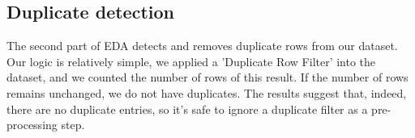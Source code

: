 \documentclass[11pt]{article}
\begin{document}
		\subsection*{Duplicate detection}
			The second part of EDA detects and removes duplicate rows from our dataset. Our logic is relatively simple, we applied a 'Duplicate Row Filter' into the dataset, and we counted the number of rows of this result. If the number of rows remains unchanged, we do not have duplicates. The results suggest that, indeed, there are no duplicate entries, so it's safe to ignore a duplicate filter as a pre-processing step.

\end{document}
